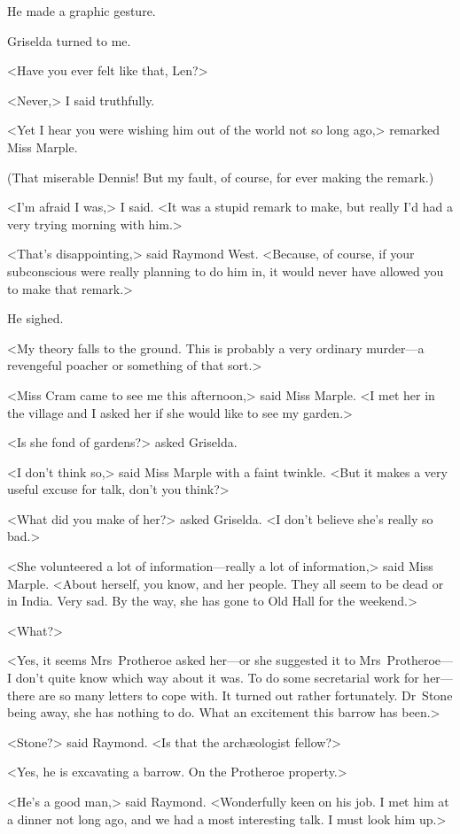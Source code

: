 He made a graphic gesture.

Griselda turned to me.

<Have you ever felt like that, Len?>

<Never,> I said truthfully.

<Yet I hear you were wishing him out of the world not so long ago,> remarked Miss Marple.

(That miserable Dennis! But my fault, of course, for ever making the remark.)

<I'm afraid I was,> I said. <It was a stupid remark to make, but really I'd had a very trying morning with him.>

<That's disappointing,> said Raymond West. <Because, of course, if your subconscious were really planning to do him in, it would never have allowed you to make that remark.>

He sighed.

<My theory falls to the ground. This is probably a very ordinary murder—a revengeful poacher or something of that sort.>

<Miss Cram came to see me this afternoon,> said Miss Marple. <I met her in the village and I asked her if she would like to see my garden.>

<Is she fond of gardens?> asked Griselda.

<I don't think so,> said Miss Marple with a faint twinkle. <But it makes a very useful excuse for talk, don't you think?>

<What did you make of her?> asked Griselda. <I don't believe she's really so bad.>

<She volunteered a lot of information—really a lot of information,> said Miss Marple. <About herself, you know, and her people. They all seem to be dead or in India. Very sad. By the way, she has gone to Old Hall for the weekend.>

<What?>

<Yes, it seems Mrs~Protheroe asked her—or she suggested it to Mrs~Protheroe—I don't quite know which way about it was. To do some secretarial work for her—there are so many letters to cope with. It turned out rather fortunately. Dr~Stone being away, she has nothing to do. What an excitement this barrow has been.>

<Stone?> said Raymond. <Is that the archæologist fellow?>

<Yes, he is excavating a barrow. On the Protheroe property.>

<He's a good man,> said Raymond. <Wonderfully keen on his job. I met him at a dinner not long ago, and we had a most interesting talk. I must look him up.>


